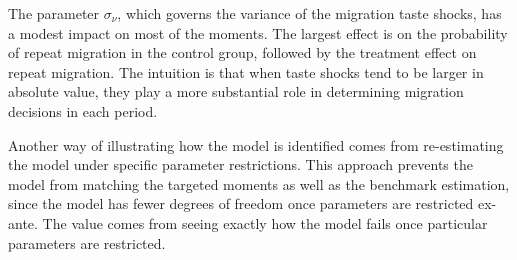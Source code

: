 \documentclass[12pt,pdftex]{article}
\begin{document}
The parameter $\sigma_{\nu}$, which governs the variance of the migration taste shocks, has a modest impact on most of the moments. The largest effect is on the probability of repeat migration in the control group, followed by the treatment effect on repeat migration. The intuition is that when taste shocks tend to be larger in absolute value, they play a more substantial role in determining migration decisions in each period.

Another way of illustrating how the model is identified comes from re-estimating the model under specific parameter restrictions. This approach prevents the model from matching the targeted moments as well as the benchmark estimation, since the model has fewer degrees of freedom once parameters are restricted ex-ante. The value comes from seeing exactly how the model fails once particular parameters are restricted.
\end{document}
